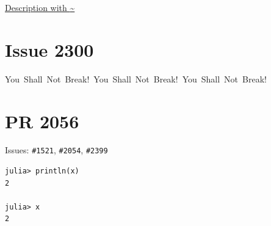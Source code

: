\label{13046111893413805288}{}


\href{https://link.with/~tilde}{Description with {\textasciitilde}}



\section{Issue 2300}



\label{5494601647308340695}{}


You~Shall~Not~Break!~You~Shall~Not~Break!~You~Shall~Not~Break!



\section{PR 2056}



\label{1659457410429464311}{}


Issues: \texttt{\#1521}, \texttt{\#2054}, \texttt{\#2399}




\begin{verbatim}
julia> println(x)
2

julia> x
2
\end{verbatim}





